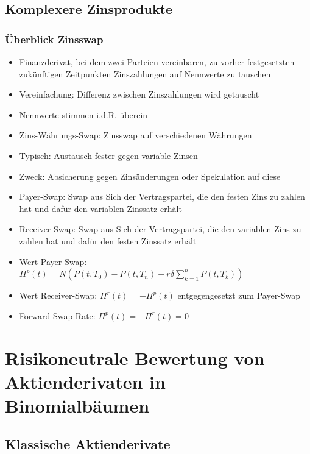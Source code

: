 \documentclass[12pt]{report}
\theoremstyle{dotless}
\theoremstyle{definition}
\begin{document}
\subsection{Komplexere Zinsprodukte}

\subsubsection{\"Uberblick Zinsswap}

\begin{itemize}
	\item Finanzderivat, bei dem zwei Parteien vereinbaren, zu vorher festgesetzten zuk\"unftigen Zeitpunkten Zinszahlungen auf Nennwerte zu tauschen
	\item Vereinfachung: Differenz zwischen Zinszahlungen wird getauscht
	\item Nennwerte stimmen i.d.R. \"uberein
	\item Zins-W\"ahrungs-Swap: Zinsswap auf verschiedenen W\"ahrungen
	\item Typisch: Austausch fester gegen variable Zinsen
	\item Zweck: Absicherung gegen Zins\"anderungen oder Spekulation auf diese
	\item Payer-Swap: Swap aus Sich der Vertragspartei, die den festen Zins zu zahlen hat und daf\"ur den variablen Zinssatz erh\"alt
	\item Receiver-Swap: Swap aus Sich der Vertragspartei, die den variablen Zins zu zahlen hat und daf\"ur den festen Zinssatz erh\"alt
	\item Wert Payer-Swap: $\Pi^p(t) = N(P(t,T_0) - P(t,T_n) - r \delta \sum_{k=1}^n P(t,T_k))$
	\item Wert Receiver-Swap: $\Pi^r(t) = - \Pi^p(t)$ entgegengesetzt zum Payer-Swap
	\item Forward Swap Rate: $\Pi^p(t) = - \Pi^r(t) = 0$
\end{itemize}

\section{Risikoneutrale Bewertung von Aktienderivaten in Binomialb\"aumen}

\subsection{Klassische Aktienderivate}
\end{document}
